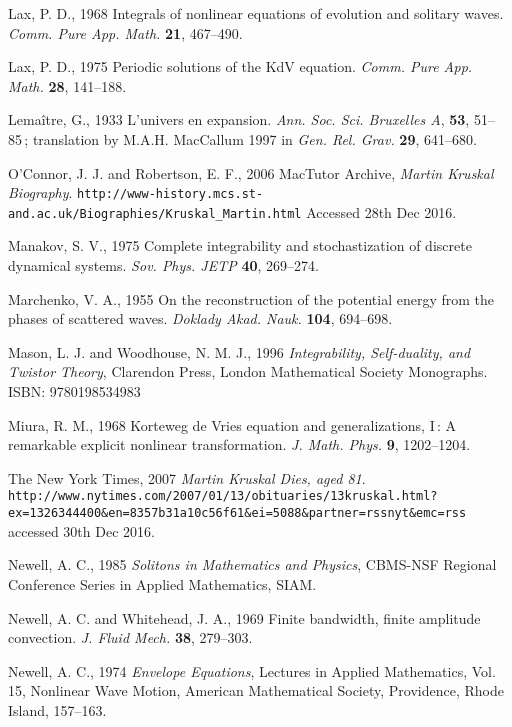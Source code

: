 \documentclass[11pt]{article}
\begin{document}
\begin{thebibliography}{30}
 Lax, P. D., 1968 Integrals of nonlinear equations of evolution and solitary waves. \textit{Comm. Pure App. Math.} \textbf{21}, 467--490.  

 Lax, P. D., 1975 Periodic solutions of the KdV equation. \textit{Comm. Pure App. Math.} \textbf{28}, 141--188. 

 Lema\^{i}tre, G., 1933 L'univers en expansion. \textit{Ann. Soc. Sci. Bruxelles A}, \textbf{53}, 51--85\,; 
translation by M.A.H. MacCallum 1997 in \textit{Gen. Rel. Grav.} \textbf{29}, 641--680.

 O'Connor, J. J. and Robertson, E. F., 2006 MacTutor Archive, \textit{Martin Kruskal Biography}.  
\verb+http://www-history.mcs.st-and.ac.uk/Biographies/Kruskal_Martin.html+ Accessed 28th Dec 2016.

 Manakov, S. V., 1975 Complete integrability and stochastization of discrete dynamical systems. 
\textit{Sov. Phys. JETP} \textbf{40}, 269--274.

 Marchenko, V. A., 1955 On the reconstruction of the potential energy from the phases of scattered waves. 
\textit{Doklady Akad. Nauk.} \textbf{104}, 694--698.

 Mason, L. J. and Woodhouse, N. M. J., 1996 \textit{Integrability, Self-duality, and Twistor Theory}, 
Clarendon Press, London Mathematical Society Monographs. ISBN: 9780198534983

 Miura, R. M., 1968 Korteweg de Vries equation and generalizations, I\,: A remarkable explicit nonlinear 
transformation. \textit{J. Math. Phys.} \textbf{9}, 1202--1204. 

 The New York Times, 2007 \textit{Martin Kruskal Dies, aged 81}.\\
 {\tiny \verb+http://www.nytimes.com/2007/01/13/obituaries/13kruskal.html?ex=1326344400&en=8357b31a10c56f61&ei=5088&partner=rssnyt&emc=rss+} accessed 30th Dec 2016. 

 Newell, A. C., 1985 \textit{Solitons in Mathematics and Physics}, CBMS-NSF Regional Conference Series in Applied Mathematics, SIAM. 

 Newell, A. C. and Whitehead, J. A., 1969 Finite bandwidth, finite amplitude convection. \textit{J. Fluid Mech.} 
\textbf{38}, 279--303.

 Newell, A. C., 1974 \textit{Envelope Equations}, Lectures in Applied Mathematics, Vol. 15, Nonlinear Wave 
Motion, American Mathematical Society, Providence, Rhode Island, 157--163.


\end{thebibliography}
\end{document}
